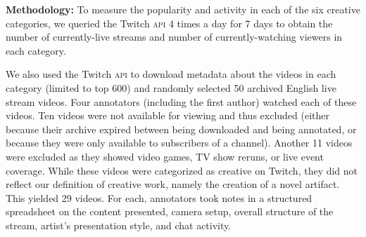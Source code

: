 \textbf{Methodology:}
To measure the popularity and activity in each of the six creative categories, we queried the Twitch \textsc{api} 4 times a day for 7 days to obtain the number of currently-live streams and number of currently-watching viewers in each category.

We also used the Twitch \textsc{api} to download metadata about the videos in each category (limited to top 600)
and randomly selected 50 archived English live stream videos. Four annotators (including the first author) watched each of these videos. Ten videos were not available for viewing and thus excluded (either because their archive expired between being downloaded and being annotated, or because they were only available to subscribers of a channel). Another 11 videos were excluded as they showed video games, TV show reruns, or live event coverage. While these videos were categorized as creative on Twitch, they did not reflect our definition of creative work, namely the creation of a novel artifact. This yielded 29 videos. For each, annotators took notes in a structured spreadsheet on the content presented, camera setup, overall structure of the stream, artist's presentation style, and chat activity.

